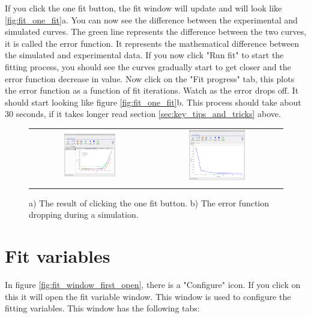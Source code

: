 If you click the one fit button, the fit window will update and will look like \ref{fig:fit_one_fit}a. You can now see the difference between the experimental and simulated curves.  The green line represents the difference between the two curves, it is called the error function. It represents the mathematical difference between the simulated and experimental data.  If you now click "Run fit" to start the fitting process, you should see the curves gradually start to get closer and the error function decrease in value. Now click on the "Fit progress" tab, this plots the error function as a function of fit iterations.  Watch as the error drops off. It should start looking like figure \ref{fig:fit_one_fit}b.  This process should take about 30 seconds, if it takes longer read section \ref{sec:key_tips_and_tricks} above.

\begin{figure}[H]
\centering
\begin{tabular}{ c c }

\includegraphics[width=0.45\textwidth]{./images/fit/fit_delta.png}
&
\includegraphics[width=0.45\textwidth]{./images/fit/fit_converge.png}
\\
\label{fig:fit_new_sim}
\end{tabular}
\caption{a) The result of clicking the one fit button. b) The error function dropping during a simulation.}
\end{figure}

\section{Fit variables}
In figure \ref{fig:fit_window_first_open}, there is a "Configure" icon. If you click on this it will open the fit variable window.  This window is used to configure the fitting variables. This window has the following tabs:

